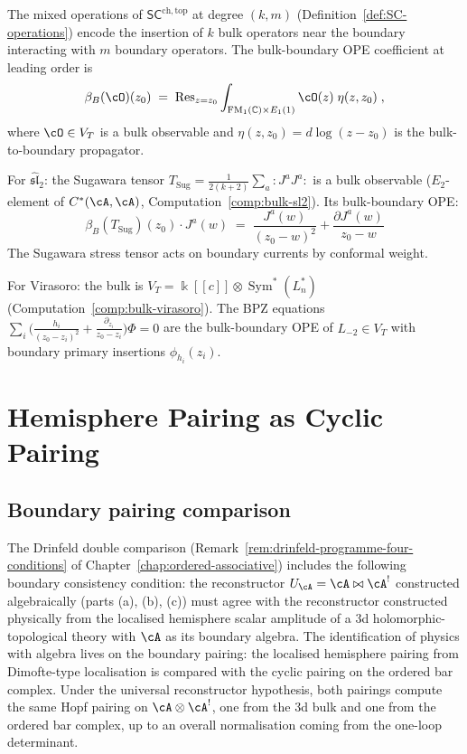 \begin{construction}
\label{constr:bulk-boundary-ope}
The mixed operations of $\mathsf{SC}^{\mathrm{ch,top}}$ at
degree $(k,m)$ (Definition~\ref{def:SC-operations}) encode the
insertion of $k$ bulk operators near the boundary interacting
with $m$ boundary operators. The bulk-boundary OPE coefficient
at leading order is
\[
\beta_B(\cO)(z_0)
\;=\;
\operatorname{Res}_{z=z_0}
\int_{\mathrm{FM}_1(\mathbb C)\times E_1(1)}
\cO(z)\;\eta(z,z_0)\;,
\]
where $\cO\in V_T$ is a bulk observable and
$\eta(z,z_0)=d\log(z-z_0)$ is the bulk-to-boundary
propagator.

For $\widehat{\mathfrak{sl}}_2$: the Sugawara tensor
$T_{\mathrm{Sug}}=\frac{1}{2(k+2)}\sum_a{:}J^a J^a{:}$
is a bulk observable ($E_2$-element of $C^*(\cA,\cA)$,
Computation~\ref{comp:bulk-sl2}). Its bulk-boundary OPE:
\[
\beta_B(T_{\mathrm{Sug}})(z_0)\cdot J^a(w)
\;=\;
\frac{J^a(w)}{(z_0-w)^2}+\frac{\partial J^a(w)}{z_0-w}
\]
The Sugawara stress tensor acts on boundary currents by
conformal weight.

For Virasoro: the bulk is $V_T=\Bbbk[[c]]\otimes
\operatorname{Sym}^*(L_n^*)$
(Computation~\ref{comp:bulk-virasoro}). The BPZ equations
$\sum_i\bigl(\frac{h_i}{(z_0-z_i)^2}
+\frac{\partial_{z_i}}{z_0-z_i}\bigr)\Phi=0$
are the bulk-boundary OPE of $L_{-2}\in V_T$ with boundary
primary insertions $\phi_{h_i}(z_i)$.
\end{construction}

\section{Hemisphere Pairing as Cyclic Pairing}
\label{sec:hemisphere-cyclic-pairing}

\subsection*{Boundary pairing comparison}

The Drinfeld double comparison
(Remark~\ref{rem:drinfeld-programme-four-conditions} of
Chapter~\ref{chap:ordered-associative}) includes the following
boundary consistency condition: the
reconstructor $U_\cA = \cA \bowtie \cA^!$ constructed
algebraically (parts (a), (b), (c)) must agree with the
reconstructor constructed physically from the localised hemisphere
scalar amplitude of a $3$d holomorphic-topological theory
with $\cA$ as its boundary algebra. The identification of
physics with algebra lives on the boundary pairing: the
localised hemisphere pairing from Dimofte-type localisation is
compared with the cyclic pairing on the ordered bar complex.
Under the universal
reconstructor hypothesis,
both pairings compute the same Hopf pairing on
$\cA \otimes \cA^!$, one from the $3$d bulk and one from the
ordered bar complex, up to an overall normalisation coming from
the one-loop determinant.


